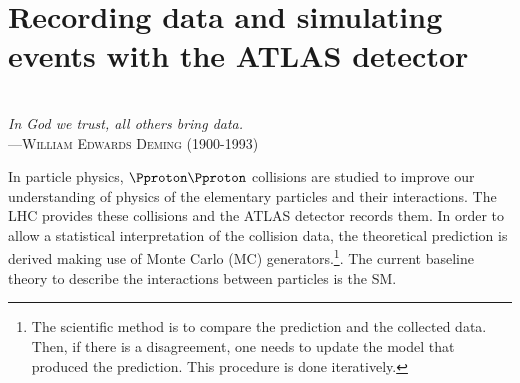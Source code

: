\begin{comment}
%
%
asdf
\end{comment}

\chapter{Recording data and simulating events with the ATLAS detector}
\label{chap:DataAndMC}

\vspace*{0.1 cm} 
\hspace*{200pt} \\
\hspace*{120pt} \textit{In God we trust, all others bring data.} \\
\hspace*{140pt} ---\textsc{William Edwards Deming (1900-1993)} \\%
\vspace*{2cm} 


In particle physics, $\Pproton \Pproton$ collisions are studied to improve our understanding 
of physics of the elementary particles and their interactions. The LHC provides these collisions 
and the ATLAS detector records them. 
In order to allow a statistical interpretation of the collision data, the theoretical prediction is 
derived making use of Monte Carlo (MC) generators.\footnote{The scientific method is to compare the prediction 
and the collected data. Then, if there is a disagreement, one needs to update the model that produced the prediction. 
This procedure is done iteratively.}.  The current baseline theory to describe
the interactions between particles is the SM.




